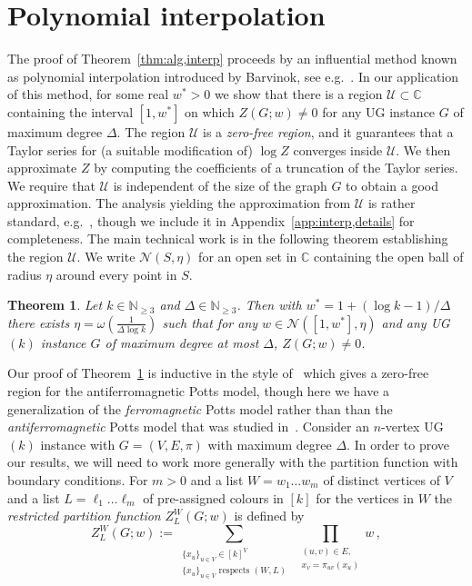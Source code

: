 \documentclass[10pt,a4paper]{article}
\newtheorem{theorem}{Theorem}
\theoremstyle{definition}
\newcommand*{\CC}{\mathbb{C}}
\newcommand*{\NN}{\mathbb{N}}
\newcommand*{\cN}{\mathcal{N}}
\newcommand*{\cU}{\mathcal{U}}
\newcommand*{\UG}[1][]{UG$(#1)$}
\begin{document}
\section{Polynomial interpolation}\label{sec:interp}
%
The proof of Theorem~\ref{thm:alg,interp} proceeds by an influential method known as polynomial interpolation introduced by Barvinok, see e.g.~\cite{Barvinok16}. 
In our application of this method, for some real $w^*>0$ we show that there is a region $\cU\subset\CC$ containing the interval $[1,w^*]$ on which $Z(G;w)\ne0$ for any UG instance $G$ of maximum degree $\Delta$. 
The region $\cU$ is a \emph{zero-free region}, and it guarantees that a Taylor series for (a suitable modification of) $\log Z$ converges inside $\cU$.
We then approximate $Z$ by computing the coefficients of a truncation of the Taylor series.
We require that $\cU$ is independent of the size of the graph $G$ to obtain a good approximation. 
The analysis yielding the approximation from $\cU$ is rather standard, e.g.~\cite{Barvinok16,Barvinok18,PR17}, though we include it in Appendix~\ref{app:interp,details} for completeness. The main technical work is in the following theorem establishing the region $\cU$. 
We write $\cN(S, \eta)$ for an open set in $\CC$ containing the open ball of radius $\eta$ around every point in $S$.
%
\begin{theorem}\label{thm:zero-free}
Let $k\in\NN_{\geq 3}$ and $\Delta\in \NN_{\geq 3}$.
Then with $w^*= 1+(\log k -1)/\Delta$ there exists $\eta=\omega(\frac{1}{\Delta\log k})$ such that for any $w\in \cN\left(\left[1,w^*\right],\eta\right)$ and any \UG[k] instance $G$ of maximum degree at most $\Delta$, $Z(G;w)\neq 0$.
\end{theorem}
%
%
Our proof of Theorem~\ref{thm:zero-free} is inductive in the style of~\cite{BDPR18} which gives a zero-free region for the antiferromagnetic Potts model, though here we have a generalization of the \emph{ferromagnetic} Potts model rather than than the \emph{antiferromagnetic} Potts model that was studied in~\cite{BDPR18}. 
%
%
Consider an $n$-vertex \UG[k] instance with $G=(V,E,\pi)$ with maximum degree $\Delta$.
In order to prove our results, we will need to work more generally with the partition function with boundary conditions.
For $m>0$ and a list $W=w_1\ldots w_m$ of distinct vertices of $V$ and a list $L=\ell_1\ldots\ell_m$ of pre-assigned colours in $[k]$ for the vertices in $W$ the \emph{restricted partition function} $Z^{W}_{L}(G;w)$ is defined by
\[
Z^{W}_{L}(G;w):=\sum_{\substack{\{x_u\}_{u\in V}\in[k]^V\\\{x_u\}_{u\in V} \text{ respects }(W,L)}}\;\prod_{\substack{(u,v)\in E,\\ x_v=\pi_{uv}(x_u)}}w\,,
\]
\end{document}

